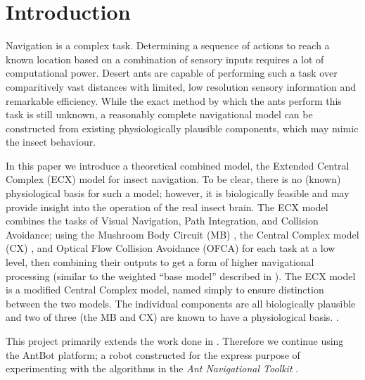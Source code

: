 \documentclass[a4paper,11pt,twoside,openright]{article}
\let\oldsection\section
\def\section{\cleardoublepage\oldsection}
\begin{document}

\raggedright

\section{ Introduction }
Navigation is a complex task. Determining a sequence of actions to reach a
known location based on a combination of sensory inputs requires a lot of
computational power. Desert ants are capable of performing such a task
over comparitively vast distances with limited, low resolution sensory
information and remarkable efficiency. While the exact method by which
the ants perform this task is still unknown, a reasonably complete navigational
model can be constructed from existing physiologically plausible components,
which may mimic the insect behaviour.
\newline
\par

In this paper we introduce a theoretical combined model, the Extended
Central Complex (ECX) model for insect navigation. To be clear, there
is no (known) physiological basis for such a model; however, it is
biologically feasible and may provide insight into the operation of
the real insect brain. The ECX model combines the tasks of Visual
Navigation, Path Integration, and Collision Avoidance; using the
Mushroom Body Circuit (MB) \cite{Ardin2016}, the Central Complex model
(CX) \cite{Stone2017}, and Optical Flow Collision Avoidance (OFCA)
\cite{Mitchell2018, Stewart2010} for each task at a low level, then
combining their outputs to get a form of higher navigational
processing (similar to the weighted ``base model'' described in
\cite{Webb2019}).  The ECX model is a modified Central Complex model,
named simply to ensure distinction between the two models. The
individual components are all biologically plausible and two of three
(the MB and CX) are known to have a physiological
basis. \cite{Ardin2016, Stone2017, Mitchell2018, Stewart2010,
  Julien2017}.
\newline
\par

This project primarily extends the work done in
\cite{Mitchell2018}. Therefore we continue using the AntBot platform; a
robot constructed for the express purpose of experimenting with the
algorithms in the \textit{Ant Navigational Toolkit}
\cite{Eberding2016, Wehner2009}.
\end{document}
